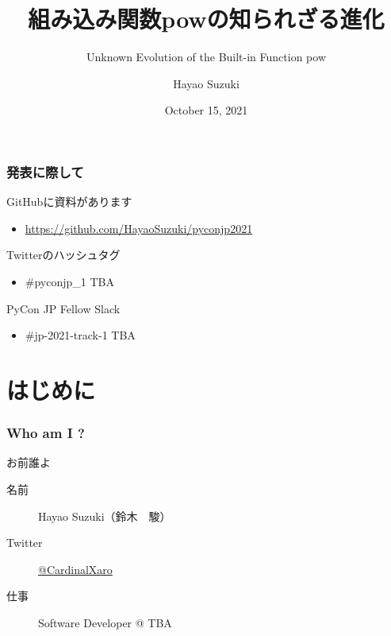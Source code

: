 \documentclass[aspectratio=169,dvipdfmx,14pt,notheorems]{beamer}
\title{組み込み関数powの知られざる進化}
\subtitle{Unknown Evolution of the Built-in Function pow}
\author[Hayao]{Hayao Suzuki}
\institute[PyCon JP 2021]{PyCon JP 2021}
\date{October 15, 2021}
\theoremstyle{definition}
\begin{document}
\begin{frame}[plain]\frametitle{}
\titlepage %
\end{frame}

\begin{frame}\frametitle{発表に際して}

\begin{block}{GitHubに資料があります}
\begin{itemize}
\item \url{https://github.com/HayaoSuzuki/pyconjp2021}
\end{itemize}
\end{block}

\begin{block}{Twitterのハッシュタグ}
\begin{itemize}
\item \#pyconjp\_1 TBA
\end{itemize}
\end{block}

\begin{block}{PyCon JP Fellow Slack}
\begin{itemize}
\item \#jp-2021-track-1 TBA
\end{itemize}
\end{block}
\end{frame}

\section{はじめに}

\begin{frame}\frametitle{Who am I ?}

\begin{block}{お前誰よ}
\begin{description}
\item[名前] Hayao Suzuki（鈴木　駿）
\item[Twitter] \href{https://twitter.com/CardinalXaro}{@CardinalXaro}
\item[仕事] Software Developer @ TBA
\end{description}
\end{block}

\end{frame}
\end{document}
